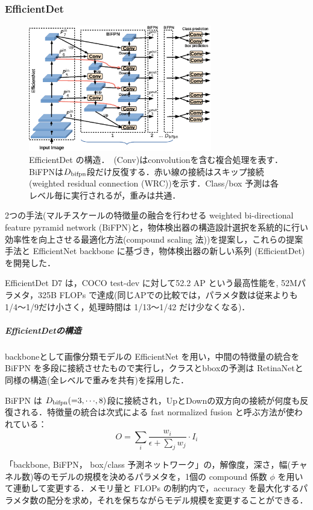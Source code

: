 \documentclass[twocolumn]{jsarticle} %
\begin{document}
\subsubsection{EfficientDet \cite{TPL20}}
\begin{figure}[tb]
    \begin{center}
        \includegraphics[width=8cm,clip]{fig/archi_EfficientDet.eps}
    \end{center}
    \caption{ EfficientDet の構造．\ (Conv)はconvolutionを含む複合処理を表す．BiFPNは$D_{\rm bifpn}$段だけ反復する．赤い線の接続はスキップ接続(weighted residual connection (WRC))を示す．Class/box 予測は各レベル毎に実行されるが，重みは共通．}
    \label{fig:archi_EfficientDet}
\end{figure}
2つの手法(マルチスケールの特徴量の融合を行わせる weighted bi-directional feature pyramid network (BiFPN)と，物体検出器の構造設計選択を系統的に行い効率性を向上させる最適化方法(compound scaling 法))を提案し，これらの提案手法と EfficientNet backbone \cite{TanLe19} に基づき，物体検出器の新しい系列 (EfficientDet)を開発した．

EfficientDet D7 は，COCO test-dev に対して52.2 AP という最高性能を, 52Mパラメタ，325B FLOPs で達成(同じAPでの比較では，パラメタ数は従来よりも1/4〜1/9だけ小さく，処理時間は 1/13〜1/42 だけ少なくなる)．

\subparagraph{EfficientDetの構造}
backboneとして画像分類モデルの EfficientNet\cite{TanLe19} を用い，中間の特徴量の統合を BiFPN を多段に接続させたもので実行し，クラスとbboxの予測は RetinaNet\cite{LGGHD17}と同様の構造(全レベルで重みを共有)を採用した．

BiFPN は $D_{\rm bifpn} ({=}3,{\cdots},8)$段に接続され，UpとDownの双方向の接続が何度も反復される．特徴量の統合は次式による fast normalized fusion と呼ぶ方法が使われている：
$$ O = \sum_i\frac{w_i}{\epsilon + \sum_jw_j}\cdot I_i $$

「backbone, BiFPN， box/class 予測ネットワーク」の，解像度，深さ，幅(チャネル数)等のモデルの規模を決めるパラメタを，1個の compound 係数 $\phi$ を用いて連動して変更する．メモリ量と FLOPs の制約内で，accuracy を最大化するパラメタ数の配分を求め，それを保ちながらモデル規模を変更することができる．
\end{document}
